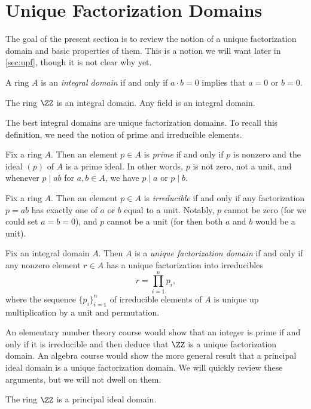 \documentclass[../notes.tex]{subfiles}
\begin{document}
\section{Unique Factorization Domains}
The goal of the present section is to review the notion of a unique factorization domain and basic properties of them. This is a notion we will want later in \cref{sec:upf}, though it is not clear why yet.
\begin{definition}
	A ring $A$ is an \textit{integral domain} if and only if $a\cdot b=0$ implies that $a=0$ or $b=0$.
\end{definition}
\begin{example}
	The ring $\ZZ$ is an integral domain. Any field is an integral domain.
\end{example}
The best integral domains are unique factorization domains. To recall this definition, we need the notion of prime and irreducible elements.
\begin{definition}[prime]
	Fix a ring $A$. Then an element $p\in A$ is \textit{prime} if and only if $p$ is nonzero and the ideal $(p)$ of $A$ is a prime ideal. In other words, $p$ is not zero, not a unit, and whenever $p\mid ab$ for $a,b\in A$, we have $p\mid a$ or $p\mid b$.
\end{definition}
\begin{definition}[irreducible]
	Fix a ring $A$. Then an element $p\in A$ is \textit{irreducible} if and only if any factorization $p=ab$ has exactly one of $a$ or $b$ equal to a unit. Notably, $p$ cannot be zero (for we could set $a=b=0$), and $p$ cannot be a unit (for then both $a$ and $b$ would be a unit).
\end{definition}
\begin{definition}
	Fix an integral domain $A$. Then $A$ is a \textit{unique factorization domain} if and only if any nonzero element $r\in A$ has a unique factorization into irreducibles
	\[r=\prod_{i=1}^np_i,\]
	where the sequence $\{p_i\}_{i=1}^n$ of irreducible elements of $A$ is unique up multiplication by a unit and permutation.
\end{definition}
An elementary number theory course would show that an integer is prime if and only if it is irreducible and then deduce that $\ZZ$ is a unique factorization domain. An algebra course would show the more general result that a principal ideal domain is a unique factorization domain. We will quickly review these arguments, but we will not dwell on them.
\begin{proposition} \label{prop:z-pid}
	The ring $\ZZ$ is a principal ideal domain.
\end{proposition}
\end{document}
